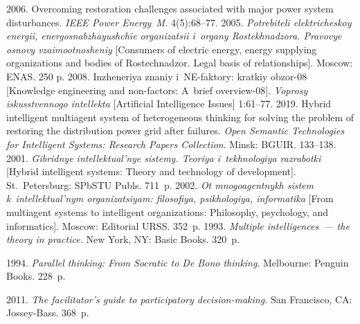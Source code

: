  \begin{multicols}{2}

\renewcommand{\bibname}{\protect\rmfamily References}

{\small\frenchspacing
 {%
 \begin{thebibliography}{99}
 2006. Overcoming restoration challenges 
associated with major power system disturbances. \textit{IEEE Power Energy~M.} 
4(5):68--77.
 2005. \textit{Potrebiteli elektricheskoy energii, 
energosnabzhayushchie organizatsii i~organy Rostekhnadzora. Pravovye osnovy 
vzaimootnosheniy} [Consumers of electric energy, energy supplying organizations and 
bodies of Rostechnadzor. Legal basis of relationships]. Moscow: ENAS. 250 p.
 2008. Inzheneriya znaniy i~NE-faktory: kratkiy obzor-08 
[Knowledge engineering and non-factors: A~brief overview-08]. \textit{Voprosy 
iskusstvennogo intellekta} [Artificial Intelligence Issues] 1:61--77.
 2019. Hybrid intelligent multiagent 
system of heterogeneous thinking for solving the problem of restoring the distribution 
power grid after failures. \textit{Open Semantic Technologies for Intelligent 
Systems: Research Papers Collection}. Minsk: BGUIR. 133--138.
 2001. \textit{Gibridnye intellektual'nye sistemy. Teoriya 
i~tekhnologiya razrabotki} [Hybrid intelligent systems: Theory and technology of 
development]. St.\ Petersburg: SPbSTU Publs. 711~p.
 2002. \textit{Ot mnogoagentnykh sistem k~intellektual'nym 
organizatsiyam: filosofiya, psikhologiya, informatika} [From multiagent systems to 
intelligent organizations: Philosophy, psychology, and informatics]. Moscow: 
Editorial URSS. 352~p.
 1993. \textit{Multiple intelligences~--- 
  the theory in practice.} New York, NY:  Basic Books. 320~p.

 1994. \textit{Parallel thinking: From Socratic to De Bono thinking}. 
Melbourne: Penguin Books. 228~p.

 2011. \textit{The facilitator's 
guide to participatory decision-making.} San Francisco, CA: Jossey-Bass. 368~p.


\end{thebibliography}}}
\end{multicols}
